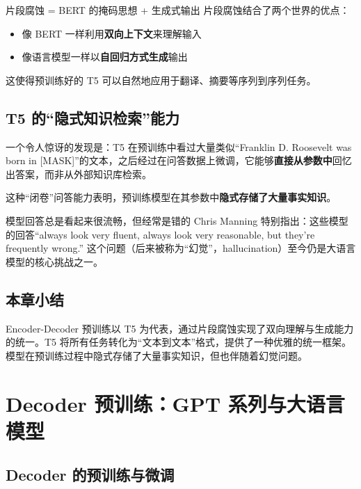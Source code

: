 \documentclass[a4paper]{article}
\begin{document}
\begin{importantbox}{片段腐蚀 = BERT 的掩码思想 + 生成式输出}
片段腐蚀结合了两个世界的优点：
\begin{itemize}
    \item 像 BERT 一样利用\textbf{双向上下文}来理解输入
    \item 像语言模型一样以\textbf{自回归方式生成}输出
\end{itemize}
这使得预训练好的 T5 可以自然地应用于翻译、摘要等序列到序列任务。
\end{importantbox}

\subsection{T5 的``隐式知识检索''能力}

一个令人惊讶的发现是：T5 在预训练中看过大量类似``Franklin D. Roosevelt was born in [MASK]''的文本，之后经过在问答数据上微调，它能够\textbf{直接从参数中}回忆出答案，而非从外部知识库检索。

这种``闭卷''问答能力表明，预训练模型在其参数中\textbf{隐式存储了大量事实知识}。

\begin{warningbox}{模型回答总是看起来很流畅，但经常是错的}
Chris Manning 特别指出：这些模型的回答``always look very fluent, always look very reasonable, but they're frequently wrong.'' 这个问题（后来被称为``幻觉''，hallucination）至今仍是大语言模型的核心挑战之一。
\end{warningbox}

\subsection{本章小结}

Encoder-Decoder 预训练以 T5 为代表，通过片段腐蚀实现了双向理解与生成能力的统一。T5 将所有任务转化为``文本到文本''格式，提供了一种优雅的统一框架。模型在预训练过程中隐式存储了大量事实知识，但也伴随着幻觉问题。


\section{Decoder 预训练：GPT 系列与大语言模型}

\subsection{Decoder 的预训练与微调}
\end{document}
